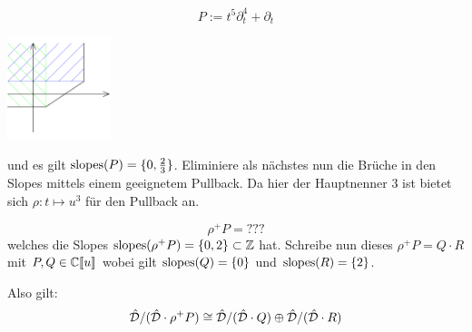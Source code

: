\begin{minipage}[hbt]{0,49\textwidth}
  \[ P:=t^5\partial_t^4 +\partial_t \]
\end{minipage}
\begin{minipage}[hbt]{0,49\textwidth}
  \begin{center} 
    \includegraphics[width=3cm]{beispiele/img/bar_e_times_x.png} 
  \end{center}
\end{minipage}

und es gilt $\operatorname{slopes}(P)=\{0,\frac{2}{3}\}$. Eliminiere als nächstes nun die
Brüche in den Slopes mittels einem geeignetem Pullback. Da hier der Hauptnenner
$3$ ist bietet sich $\rho:t\mapsto u^3$ für den Pullback an.

\[ \rho^+P=??? \]
welches die Slopes $\operatorname{slopes}(\rho^+P)=\{0,2\}\subset\mathbb{Z}$ hat. Schreibe nun dieses
$\rho^+P=Q\cdot R$ mit $P,Q\in{\mathbb C\llbracket u\rrbracket}$ wobei gilt $\operatorname{slopes}(Q)=\{0\}$ und
$\operatorname{slopes}(R)=\{2\}$.

Also gilt:
\[
  \hat{\mathcal{D}}/(\hat{\mathcal{D}}\cdot\rho^+P)\cong
  \hat{\mathcal{D}}/(\hat{\mathcal{D}}\cdot Q) \oplus  \hat{\mathcal{D}}/(\hat{\mathcal{D}}\cdot R)
\]


